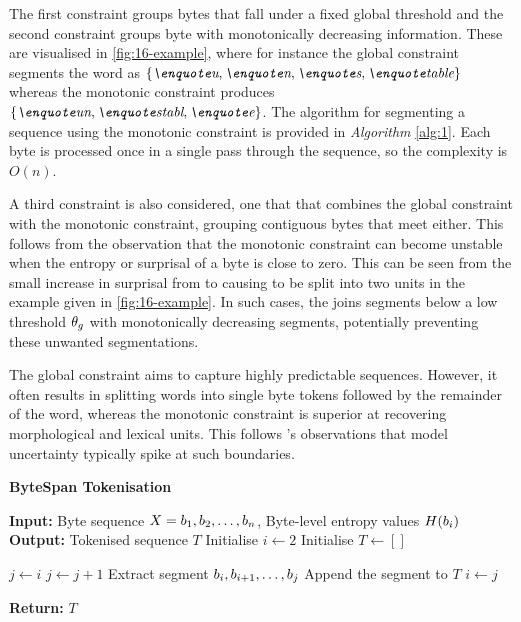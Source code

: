 The first constraint groups bytes that fall under a fixed global threshold and the second constraint groups byte with monotonically decreasing information. These are visualised in \cref{fig:16-example}, where for instance the global constraint segments the word  as $\{\ex{u}, \ex{n}, \ex{s}, \ex{table} \}$ whereas the monotonic constraint produces $\{\ex{un}, \ex{stabl}, \ex{e}\}$. The algorithm for segmenting a sequence using the monotonic constraint is provided in \emph{Algorithm} \ref{alg:1}. Each byte is processed once in a single pass through the sequence, so the complexity is \(O(n)\). 

A third constraint is also considered, one that that combines the global constraint with the monotonic constraint, grouping contiguous bytes that meet either. This follows from the observation that the monotonic constraint can become unstable when the entropy or surprisal of a byte is close to zero. This can be seen from the small increase in surprisal from  to  causing  to be split into two units in the example given in \cref{fig:16-example}. In such cases, the  joins segments below a low threshold \(\theta_g \) with monotonically decreasing segments, potentially preventing these unwanted segmentations.


The global constraint aims to capture highly predictable sequences. However, it often results in splitting words into single byte tokens followed by the remainder of the word, whereas the monotonic constraint is superior at recovering morphological and lexical units. This follows \citet{elman1990finding}'s observations that model uncertainty typically spike at such boundaries.

\begin{algorithm}[t]
\caption{\textbf{ByteSpan Tokenisation}}
\begin{algorithmic}[1]
\STATE \textbf{Input:} Byte sequence $X = b_1, b_2, \dots, b_n$, Byte-level entropy values $H(b_i)$
\STATE \textbf{Output:} Tokenised sequence $T$
\STATE Initialise $i \gets 2$ 
\STATE Initialise $T \gets []$ 

    \STATE $j \gets i$
        \STATE $j \gets j + 1$
    \ENDWHILE
    \STATE Extract segment $b_i, b_{i+1}, \dots, b_{j}$
    \STATE Append the segment to $T$
    \STATE $i \gets j$
\ENDWHILE

\STATE \textbf{Return:} $T$
\end{algorithmic}
\label{alg:1}
\end{algorithm}

